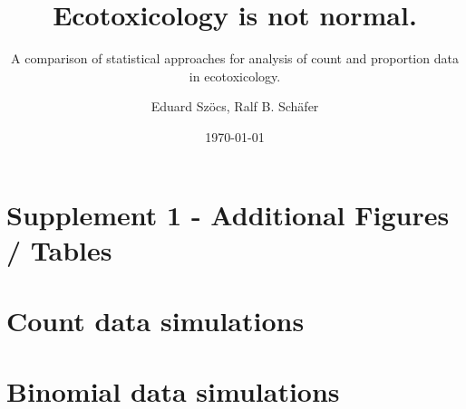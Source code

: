 \documentclass{scrartcl}\usepackage[]{graphicx}\usepackage[]{color}
\title{Ecotoxicology is not normal.}
\subtitle{A comparison of statistical approaches for analysis of count and proportion data in ecotoxicology.}
\author{Eduard Szöcs, Ralf B. Schäfer}
\date{\today}
\begin{document}
\maketitle
\thispagestyle{empty}
\section*{Supplement 1 - Additional Figures / Tables}
\tableofcontents
\newpage

\section{Count data simulations}






\section{Binomial data simulations}




\end{document}

